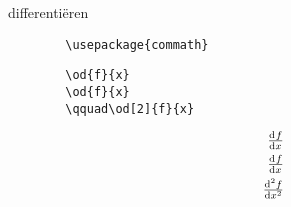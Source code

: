 \begin{frame}[fragile]{differentiëren}
    \begin{verbatim}
        \usepackage{commath}
    \end{verbatim}

    \begin{verbatim}
        \od{f}{x}
        \od{f}{x} 
        \qquad\od[2]{f}{x}
    \end{verbatim}

    \begin{tcolorbox}[width=11cm]
        \begin{align*}
        \od{f}{x}\\
        \od{f}{x} \\
        \qquad\od[2]{f}{x}\\
        \end{align*}
        \end{tcolorbox}
\end{frame}